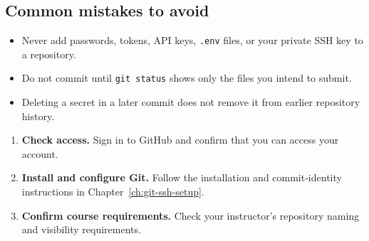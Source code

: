 \subsection*{Common mistakes to avoid}
\begin{itemize}[leftmargin=1.5em,itemsep=0.3em,topsep=0.2em,label=\textcolor{red!70!black}{\faTimes}]
  \item Never add passwords, tokens, API keys, \texttt{.env} files, or your private SSH key to a repository.
  \item Do not commit until \texttt{git status} shows only the files you intend to submit.
  \item Deleting a secret in a later commit does not remove it from earlier repository history.
\end{itemize}

\begin{tcolorbox}[
  enhanced,
  colback=UTPPaleBlue!18,
  colframe=UTPBlue!20,
  boxrule=0.5pt,
  arc=2mm,
  left=4mm,right=4mm,top=3mm,bottom=3mm
]
\begin{enumerate}[leftmargin=1.7em,itemsep=0.55em,topsep=0.55em,parsep=0.1em]
  \item \textbf{Check access.} Sign in to GitHub and confirm that you can access your account.
  \item \textbf{Install and configure Git.} Follow the installation and commit-identity instructions in Chapter~\ref{ch:git-ssh-setup}.
  \item \textbf{Confirm course requirements.} Check your instructor's repository naming and visibility requirements.
\end{enumerate}
\end{tcolorbox}